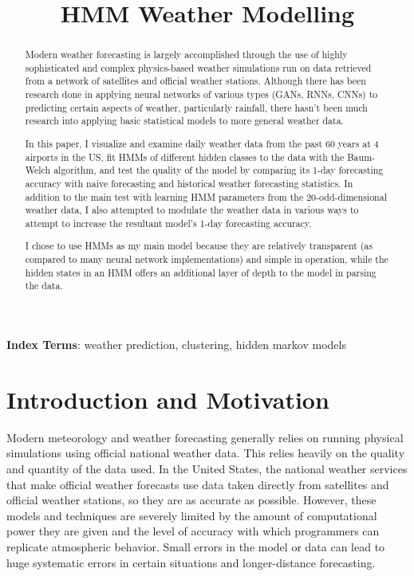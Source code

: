 \documentclass[a4paper]{article}
\title{HMM Weather Modelling}
\begin{document}
\maketitle
% 
\begin{abstract}

Modern weather forecasting is largely accomplished through the use of highly sophisticated and complex physics-based weather simulations\cite{NWP} run on data retrieved from a network of satellites and official weather stations\cite{weatherstats}. Although there has been research done in applying neural networks of various types (GANs, RNNs, CNNs) to predicting certain aspects of weather, particularly rainfall, there hasn't been much research into applying basic statistical models to more general weather data. 

In this paper, I visualize and examine daily weather data from the past 60 years at 4 airports in the US, fit HMMs of different hidden classes to the data with the Baum-Welch algorithm, and test the quality of the model by comparing its 1-day forecasting accuracy with naive forecasting and historical weather forecasting statistics. In addition to the main test with learning HMM parameters from the 20-odd-dimensional weather data, I also attempted to modulate the weather data in various ways to attempt to increase the resultant model's 1-day forecasting accuracy.

I chose to use HMMs as my main model because they are relatively transparent (as compared to many neural network implementations) and simple in operation, while the hidden states in an HMM offers an additional layer of depth to the model in parsing the data.
\end{abstract}

\noindent\textbf{Index Terms}: weather prediction, clustering, hidden markov models




\section{Introduction and Motivation}


Modern meteorology and weather forecasting generally relies on running physical simulations using official national weather data. This relies heavily on the quality and quantity of the data used. In the United States, the national weather services that make official weather forecasts use data taken directly from satellites and official weather stations, so they are as accurate as possible. However, these models and techniques are severely limited by the amount of computational power they are given and the level of accuracy with which programmers can replicate atmospheric behavior. Small errors in the model or data can lead to huge systematic errors in certain situations and longer-distance forecasting.
\end{document}
